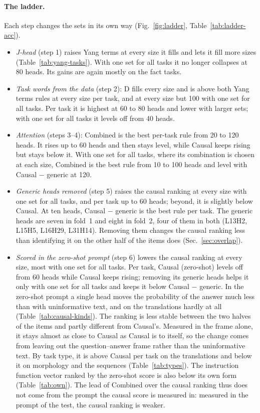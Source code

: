 \documentclass[10pt,a4paper]{article}
\begin{document}
\paragraph{The ladder.} Each step changes the sets in its own way (Fig.~\ref{fig:ladder}, Table~\ref{tab:ladder-acc}).
\begin{itemize}
\item \emph{J-head} (step 1) raises Yang terms at every size it fills and lets it fill more sizes (Table~\ref{tab:yang-tasks}). With one set for all tasks it no longer collapses at 80 heads. Its gains are again mostly on the fact tasks.
\item \emph{Task words from the data} (step 2): D fills every size and is above both Yang terms rules at every size per task, and at every size but 100 with one set for all tasks. Per task it is highest at 60 to 80 heads and lower with larger sets; with one set for all tasks it levels off from 40 heads.
\item \emph{Attention} (steps 3--4): Combined is the best per-task rule from 20 to 120 heads. It rises up to 60 heads and then stays level, while Causal keeps rising but stays below it. With one set for all tasks, where its combination is chosen at each size, Combined is the best rule from 10 to 100 heads and level with Causal $-$ generic at 120.
\item \emph{Generic heads removed} (step 5) raises the causal ranking at every size with one set for all tasks, and per task up to 60 heads; beyond, it is slightly below Causal. At ten heads, Causal $-$ generic is the best rule per task. The generic heads are seven in fold~1 and eight in fold~2, four of them in both (L13H2, L15H5, L16H29, L31H14). Removing them changes the causal ranking less than identifying it on the other half of the items does (Sec.~\ref{sec:overlap}).
\item \emph{Scored in the zero-shot prompt} (step 6) lowers the causal ranking at every size, most with one set for all tasks. Per task, Causal (zero-shot) levels off from 60 heads while Causal keeps rising; removing its generic heads helps it only with one set for all tasks and keeps it below Causal $-$ generic. In the zero-shot prompt a single head moves the probability of the answer much less than with uninformative text, and on the translations hardly at all (Table~\ref{tab:causal-kinds}). The ranking is less stable between the two halves of the items and partly different from Causal's. Measured in the frame alone, it stays almost as close to Causal as Causal is to itself, so the change comes from leaving out the question--answer frame rather than the uninformative text. By task type, it is above Causal per task on the translations and below it on morphology and the sequences (Table~\ref{tab:types}). The instruction function vector ranked by the zero-shot score is also below its own form (Table~\ref{tab:own}). The lead of Combined over the causal ranking thus does not come from the prompt the causal score is measured in: measured in the prompt of the test, the causal ranking is weaker.

\end{itemize}
\end{document}
